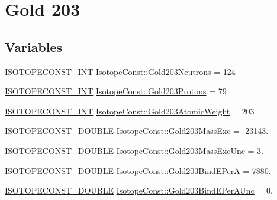 \hypertarget{group___isotope_const-_gold-_au203}{}\section{Gold 203}
\label{group___isotope_const-_gold-_au203}
\subsection*{Variables}
\begin{DoxyCompactItemize}
\item 
\mbox{\hyperlink{group___isotope_const-_macros_ga5f18360b3e99483a35c32d789e62621c}{I\+S\+O\+T\+O\+P\+E\+C\+O\+N\+S\+T\+\_\+\+I\+NT}} \mbox{\hyperlink{group___isotope_const-_gold-_au203_ga7f50d7bcb092bbf2fd8f3a5861a205e2}{Isotope\+Const\+::\+Gold203\+Neutrons}} = 124
\item 
\mbox{\hyperlink{group___isotope_const-_macros_ga5f18360b3e99483a35c32d789e62621c}{I\+S\+O\+T\+O\+P\+E\+C\+O\+N\+S\+T\+\_\+\+I\+NT}} \mbox{\hyperlink{group___isotope_const-_gold-_au203_ga66f29c66d5ff1025b743f88d4ba8d67d}{Isotope\+Const\+::\+Gold203\+Protons}} = 79
\item 
\mbox{\hyperlink{group___isotope_const-_macros_ga5f18360b3e99483a35c32d789e62621c}{I\+S\+O\+T\+O\+P\+E\+C\+O\+N\+S\+T\+\_\+\+I\+NT}} \mbox{\hyperlink{group___isotope_const-_gold-_au203_ga14699f8d2d66a7a2ccc5a93b51fa3e9e}{Isotope\+Const\+::\+Gold203\+Atomic\+Weight}} = 203
\item 
\mbox{\hyperlink{group___isotope_const-_macros_ga8f45a7272ce02c0b4c65c44636ed719a}{I\+S\+O\+T\+O\+P\+E\+C\+O\+N\+S\+T\+\_\+\+D\+O\+U\+B\+LE}} \mbox{\hyperlink{group___isotope_const-_gold-_au203_ga6dc09dc9aa3ad8c7e5956cde1dd8b655}{Isotope\+Const\+::\+Gold203\+Mass\+Exc}} = -\/23143.
\item 
\mbox{\hyperlink{group___isotope_const-_macros_ga8f45a7272ce02c0b4c65c44636ed719a}{I\+S\+O\+T\+O\+P\+E\+C\+O\+N\+S\+T\+\_\+\+D\+O\+U\+B\+LE}} \mbox{\hyperlink{group___isotope_const-_gold-_au203_ga405358145cda62a85603d1c51173f5c8}{Isotope\+Const\+::\+Gold203\+Mass\+Exc\+Unc}} = 3.
\item 
\mbox{\hyperlink{group___isotope_const-_macros_ga8f45a7272ce02c0b4c65c44636ed719a}{I\+S\+O\+T\+O\+P\+E\+C\+O\+N\+S\+T\+\_\+\+D\+O\+U\+B\+LE}} \mbox{\hyperlink{group___isotope_const-_gold-_au203_ga80d14842962699acbcb74b7ef59b8727}{Isotope\+Const\+::\+Gold203\+Bind\+E\+PerA}} = 7880.
\item 
\mbox{\hyperlink{group___isotope_const-_macros_ga8f45a7272ce02c0b4c65c44636ed719a}{I\+S\+O\+T\+O\+P\+E\+C\+O\+N\+S\+T\+\_\+\+D\+O\+U\+B\+LE}} \mbox{\hyperlink{group___isotope_const-_gold-_au203_ga738d63a3d5f7a4291f82bd8ac1a7060b}{Isotope\+Const\+::\+Gold203\+Bind\+E\+Per\+A\+Unc}} = 0.

\end{DoxyCompactItemize}
